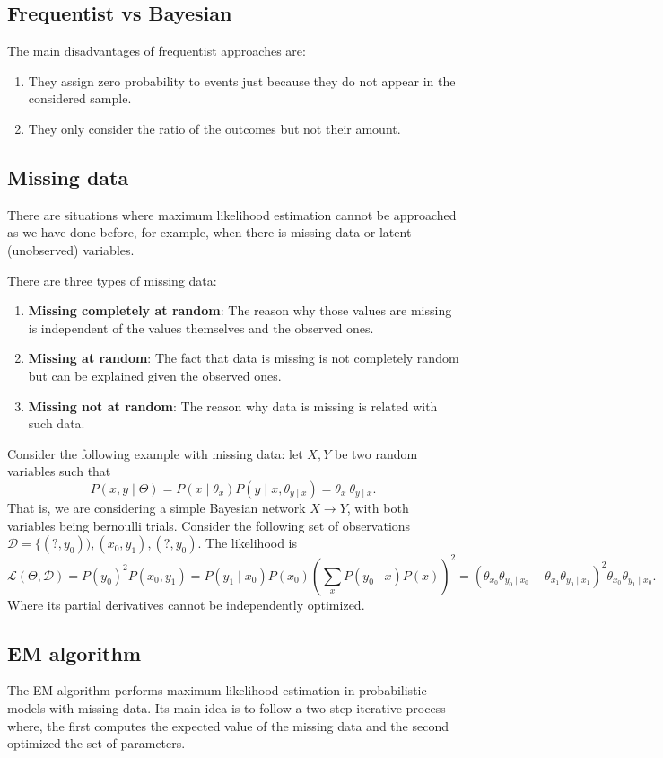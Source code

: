 \documentclass[11pt]{article}
\theoremstyle{definition}
\begin{document}
\subsection{Frequentist vs Bayesian}

The main disadvantages of frequentist approaches are:
\begin{enumerate}
  \item They assign zero probability to events just because they do not appear in the considered sample.
  \item They only consider the ratio of the outcomes but not their amount.
\end{enumerate}

\subsection{Missing data}

There are situations where maximum likelihood estimation cannot be approached as we have done before, for example, when there is missing data or latent (unobserved) variables.

There are three types of missing data:
\begin{enumerate}
  \item \textbf{Missing completely at random}: The reason why those values are missing is independent of the values themselves and the observed ones.
  \item \textbf{Missing at random}: The fact that data is missing is not completely random but can be explained given the observed ones.
  \item \textbf{Missing not at random}: The reason why data is missing is related with such data.
\end{enumerate}

Consider the following example with missing data: let \( X, Y \) be two random variables such that
\[
   P(x, y \mid \Theta) = P(x \mid \theta_x)P(y \mid x, \theta_{y\mid x}) = \theta_x \ \theta_{y\mid x}.
\]
That is, we are considering a simple Bayesian network \( X \to Y \), with both variables being bernoulli trials. Consider the following set of observations \( \mathcal{D} = \{(?, y_0)), (x_0, y_1), (?, y_0) \). The likelihood is
\[
   \mathcal{L}(\Theta, \mathcal{D}) = P(y_0)^2P(x_0, y_1) = P(y_1 \mid x_0)P(x_0)\left(\sum_x P(y_0\mid x)P(x)\right)^2 = (\theta_{x_0}\theta_{y_0 \mid x_0} + \theta_{x_1}\theta_{y_0 \mid x_1} )^2 \theta_{x_0}\theta_{y_1 \mid x_0}.
\]  
Where its partial derivatives cannot be independently optimized. 

\subsection{EM algorithm}
The EM algorithm performs maximum likelihood estimation in probabilistic models with missing data. Its main idea is to follow a two-step iterative process where, the first computes the expected value of the missing data and the second optimized the set of parameters.




\clearpage
\nocite{*}


\end{document}
